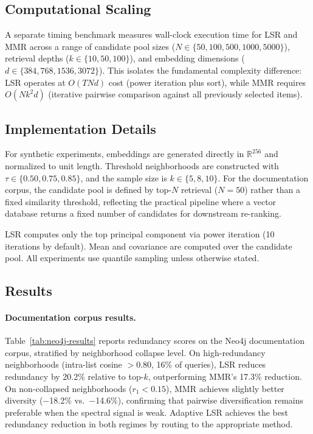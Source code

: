\documentclass{article}
\begin{document}
\subsection{Computational Scaling}

A separate timing benchmark measures wall-clock execution time for LSR and MMR across a range of candidate pool sizes ($N \in \{50, 100, 500, 1000, 5000\}$), retrieval depths ($k \in \{10, 50, 100\}$), and embedding dimensions ($d \in \{384, 768, 1536, 3072\}$). This isolates the fundamental complexity difference: LSR operates at $O(TNd)$ cost (power iteration plus sort), while MMR requires $O(Nk^2d)$ (iterative pairwise comparison against all previously selected items).

\subsection{Implementation Details}

For synthetic experiments, embeddings are generated directly in $\mathbb{R}^{256}$ and normalized to unit length. Threshold neighborhoods are constructed with $\tau \in \{0.50, 0.75, 0.85\}$, and the sample size is $k \in \{5, 8, 10\}$. For the documentation corpus, the candidate pool is defined by top-$N$ retrieval ($N = 50$) rather than a fixed similarity threshold, reflecting the practical pipeline where a vector database returns a fixed number of candidates for downstream re-ranking.

LSR computes only the top principal component via power iteration (10 iterations by default). Mean and covariance are computed over the candidate pool. All experiments use quantile sampling unless otherwise stated.

\subsection{Results}

\paragraph{Documentation corpus results.}
Table~\ref{tab:neo4j-results} reports redundancy scores on the Neo4j documentation corpus, stratified by neighborhood collapse level. On high-redundancy neighborhoods (intra-list cosine $> 0.80$, 16\% of queries), LSR reduces redundancy by 20.2\% relative to top-$k$, outperforming MMR's 17.3\% reduction. On non-collapsed neighborhoods ($r_1 < 0.15$), MMR achieves slightly better diversity ($-$18.2\% vs.\ $-$14.6\%), confirming that pairwise diversification remains preferable when the spectral signal is weak. Adaptive LSR achieves the best redundancy reduction in both regimes by routing to the appropriate method.
\end{document}

